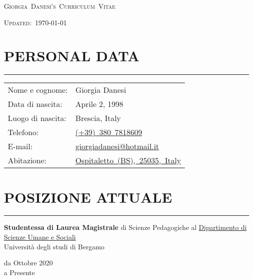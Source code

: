 \documentclass[10pt]{article}
\newcommand{\cvsection}[1]{\section*{\centering\normalsize\uppercase{#1}}\vspace{-16pt}\rule{\linewidth}{0.2pt}\vspace{6pt}}
\begin{document}
\pagestyle{empty}

\centering
{\huge\textsc{Giorgia~Danesi's~Curriculum~Vitae}\par}
{\textsc{Updated:~}\today\par}
\raggedright
\vspace{1cm}

\cvsection{personal data}

\noindent
\begin{minipage}[t]{.5\textwidth}
	\raggedright
	\begin{tabular}{@{}ll@{}}
	Nome e cognome: & Giorgia Danesi\\
	Data di nascita: & Aprile 2, 1998 \\
	Luogo di nascita: & Brescia, Italy \\
	Telefono: & \href{tel:+393807818609}{(+39)~380~7818609} \\
	E-mail: & \href{mailto:giorgiadanesi@hotmail.it}{giorgiadanesi@hotmail.it} \\
	Abitazione: & \href{https://goo.gl/maps/Ue2EE2oHfSvVetSW9}{Ospitaletto~(BS),~25035,~Italy}
	\end{tabular}
\end{minipage}%
\begin{minipage}[t]{.5\textwidth}
	\raggedleft
\end{minipage}

\cvsection{Posizione attuale}

\noindent
\begin{minipage}[t]{.8\textwidth}
	\textbf{Studentessa di Laurea Magistrale} di Scienze Pedagogiche al \href{https://dsus.unibg.it/}{Dipartimento di Scienze Umane e Sociali} \\
	Università degli studi di Bergamo
\end{minipage}%
\hfill\vrule\hfill
\begin{minipage}[t]{.16\textwidth}
	\raggedleft
	da Ottobre 2020\\
	a Presente
\end{minipage}
\end{document}
